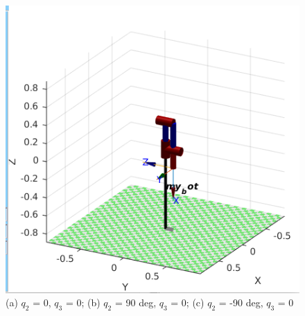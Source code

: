\documentclass{article}
\begin{document}
\begin{center}
\begin{figure}[!htb]
\begin{minipage}{0.33\textwidth}
   \end{minipage}\hfill
   \begin{minipage}{0.33\textwidth}
     \centering
     \includegraphics[width=\linewidth]{images/frame3_q2_-90.png}
   \end{minipage}
   \caption{(a) $q_2$ = 0, $q_3$ = 0; (b) $q_2$ = 90 deg, $q_3$ = 0; (c) $q_2$ = -90 deg, $q_3$ = 0}

\end{figure} 
\end{center}
\end{document}
